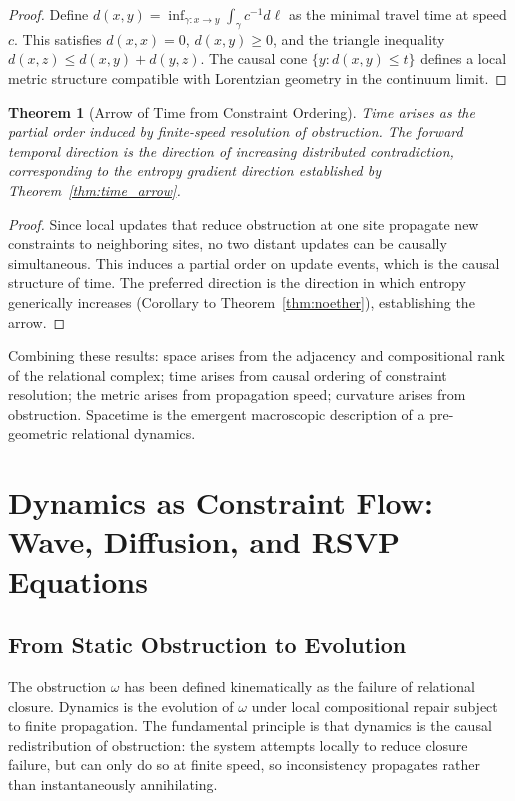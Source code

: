\documentclass[12pt,a4paper,openany]{book}
\theoremstyle{plain}
\newtheorem{theorem}{Theorem}[chapter]
\theoremstyle{definition}
\theoremstyle{remark}
\begin{document}
\begin{proof}
Define $d(x,y) = \inf_{\gamma:x\to y}\int_\gamma c^{-1}d\ell$ as the minimal travel time at speed $c$. This satisfies $d(x,x) = 0$, $d(x,y) \geq 0$, and the triangle inequality $d(x,z) \leq d(x,y) + d(y,z)$. The causal cone $\{y : d(x,y) \leq t\}$ defines a local metric structure compatible with Lorentzian geometry in the continuum limit.
\end{proof}

\begin{theorem}[Arrow of Time from Constraint Ordering]
\label{thm:time_from_constraint}
Time arises as the partial order induced by finite-speed resolution of obstruction. The forward temporal direction is the direction of increasing distributed contradiction, corresponding to the entropy gradient direction established by Theorem~\ref{thm:time_arrow}.
\end{theorem}

\begin{proof}
Since local updates that reduce obstruction at one site propagate new constraints to neighboring sites, no two distant updates can be causally simultaneous. This induces a partial order on update events, which is the causal structure of time. The preferred direction is the direction in which entropy generically increases (Corollary to Theorem~\ref{thm:noether}), establishing the arrow.
\end{proof}

Combining these results: space arises from the adjacency and compositional rank of the relational complex; time arises from causal ordering of constraint resolution; the metric arises from propagation speed; curvature arises from obstruction. Spacetime is the emergent macroscopic description of a pre-geometric relational dynamics.

\section{Dynamics as Constraint Flow: Wave, Diffusion, and RSVP Equations}
\label{sec:constraint_flow_dynamics}

\subsection{From Static Obstruction to Evolution}

The obstruction $\omega$ has been defined kinematically as the failure of relational closure. Dynamics is the evolution of $\omega$ under local compositional repair subject to finite propagation. The fundamental principle is that dynamics is the causal redistribution of obstruction: the system attempts locally to reduce closure failure, but can only do so at finite speed, so inconsistency propagates rather than instantaneously annihilating.
\end{document}

